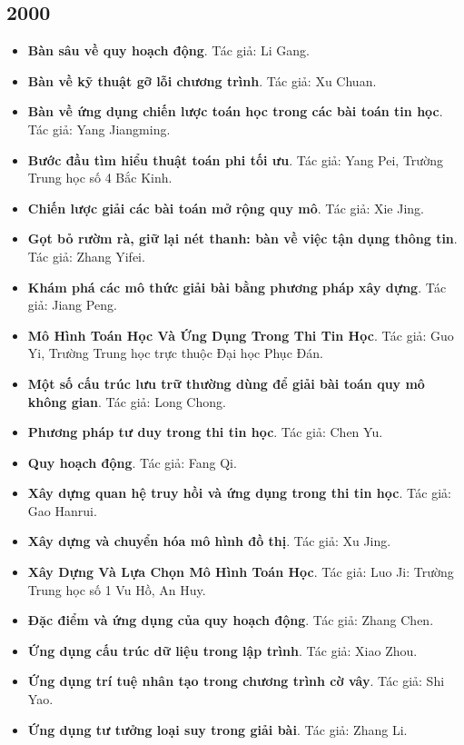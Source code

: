 \documentclass[11pt]{article}
\begin{document}
\subsection{2000}
\begin{itemize}[leftmargin=2em]
  \item \textbf{Bàn sâu về quy hoạch động}. Tác giả: Li Gang.
  \item \textbf{Bàn về kỹ thuật gỡ lỗi chương trình}. Tác giả: Xu Chuan.
  \item \textbf{Bàn về ứng dụng chiến lược toán học trong các bài toán tin học}. Tác giả: Yang Jiangming.
  \item \textbf{Bước đầu tìm hiểu thuật toán phi tối ưu}. Tác giả: Yang Pei, Trường Trung học số 4 Bắc Kinh.
  \item \textbf{Chiến lược giải các bài toán mở rộng quy mô}. Tác giả: Xie Jing.
  \item \textbf{Gọt bỏ rườm rà, giữ lại nét thanh: bàn về việc tận dụng thông tin}. Tác giả: Zhang Yifei.
  \item \textbf{Khám phá các mô thức giải bài bằng phương pháp xây dựng}. Tác giả: Jiang Peng.
  \item \textbf{Mô Hình Toán Học Và Ứng Dụng Trong Thi Tin Học}. Tác giả: Guo Yi, Trường Trung học trực thuộc Đại học Phục Đán.
  \item \textbf{Một số cấu trúc lưu trữ thường dùng để giải bài toán quy mô không gian}. Tác giả: Long Chong.
  \item \textbf{Phương pháp tư duy trong thi tin học}. Tác giả: Chen Yu.
  \item \textbf{Quy hoạch động}. Tác giả: Fang Qi.
  \item \textbf{Xây dựng quan hệ truy hồi và ứng dụng trong thi tin học}. Tác giả: Gao Hanrui.
  \item \textbf{Xây dựng và chuyển hóa mô hình đồ thị}. Tác giả: Xu Jing.
  \item \textbf{Xây Dựng Và Lựa Chọn Mô Hình Toán Học}. Tác giả: Luo Ji: Trường Trung học số 1 Vu Hồ, An Huy.
  \item \textbf{Đặc điểm và ứng dụng của quy hoạch động}. Tác giả: Zhang Chen.
  \item \textbf{Ứng dụng cấu trúc dữ liệu trong lập trình}. Tác giả: Xiao Zhou.
  \item \textbf{Ứng dụng trí tuệ nhân tạo trong chương trình cờ vây}. Tác giả: Shi Yao.
  \item \textbf{Ứng dụng tư tưởng loại suy trong giải bài}. Tác giả: Zhang Li.
\end{itemize}
\end{document}
